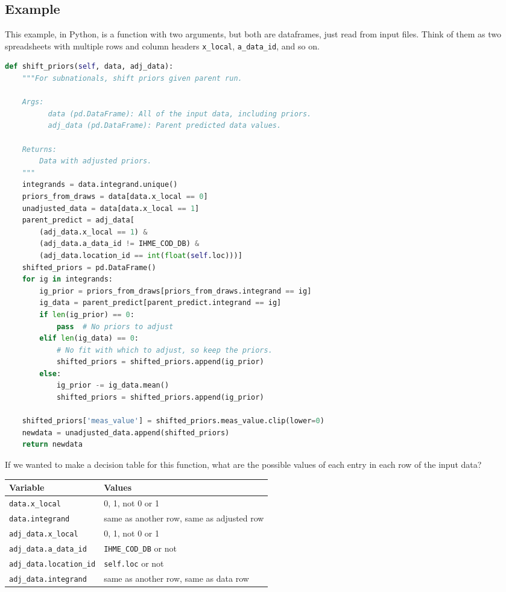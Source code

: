 \documentclass[fleqn,10pt]{olplainarticle}
\begin{document}
\subsection{Example}
This example, in Python, is a function with two arguments, but both
are dataframes, just read from input files. Think of them as two spreadsheets
with multiple rows and column headers \lstinline!x_local!, \lstinline!a_data_id!,
and so on.
\begin{lstlisting}[language=Python]
def shift_priors(self, data, adj_data):
    """For subnationals, shift priors given parent run.

    Args:
          data (pd.DataFrame): All of the input data, including priors.
          adj_data (pd.DataFrame): Parent predicted data values.

    Returns:
        Data with adjusted priors.
    """
    integrands = data.integrand.unique()
    priors_from_draws = data[data.x_local == 0]
    unadjusted_data = data[data.x_local == 1]
    parent_predict = adj_data[
        (adj_data.x_local == 1) &
        (adj_data.a_data_id != IHME_COD_DB) &
        (adj_data.location_id == int(float(self.loc)))]
    shifted_priors = pd.DataFrame()
    for ig in integrands:
        ig_prior = priors_from_draws[priors_from_draws.integrand == ig]
        ig_data = parent_predict[parent_predict.integrand == ig]
        if len(ig_prior) == 0:
            pass  # No priors to adjust
        elif len(ig_data) == 0:
            # No fit with which to adjust, so keep the priors.
            shifted_priors = shifted_priors.append(ig_prior)
        else:
            ig_prior -= ig_data.mean()
            shifted_priors = shifted_priors.append(ig_prior)

    shifted_priors['meas_value'] = shifted_priors.meas_value.clip(lower=0)
    newdata = unadjusted_data.append(shifted_priors)
    return newdata
\end{lstlisting}

If we wanted to make a decision table for this function, what are
the possible values of each entry in each row of the input data?

\begin{center}
\begin{tabular}{|l|l|}
\hline Variable & Values \\ \hline
\lstinline!data.x_local! & 0, 1, not 0 or 1 \\
\lstinline!data.integrand! & same as another row, same as adjusted row \\
\lstinline!adj_data.x_local! & 0, 1, not 0 or 1 \\
\lstinline!adj_data.a_data_id! & \lstinline!IHME_COD_DB! or not \\
\lstinline!adj_data.location_id! & \lstinline!self.loc! or not \\
\lstinline!adj_data.integrand! & same as another row, same as data row \\ \hline
\end{tabular}
\end{center}
\end{document}
